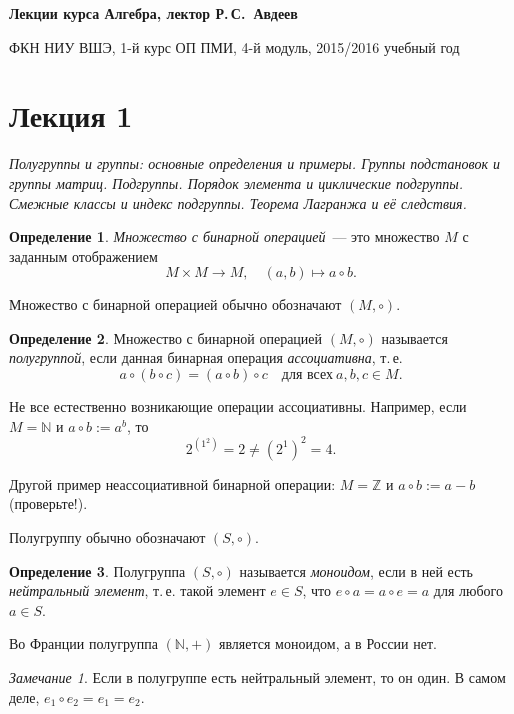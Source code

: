 \documentclass[a4paper,10pt]{amsart}
\def\ZZ{{\mathbb Z}}%
\def\NN{{\mathbb N}}%
\theoremstyle{definition}
\newtheorem{definition}{Определение}
\theoremstyle{remark}
\newtheorem{remark}{Замечание}
\begin{document}
%
\sloppy
%
\centerline{\large \bf Лекции курса \guillemotleft
Алгебра\guillemotright{}, лектор Р.\,С.~Авдеев}

\smallskip

\centerline{\large ФКН НИУ ВШЭ, 1-й курс ОП ПМИ, 4-й модуль,
2015/2016 учебный год}


\bigskip

\section*{Лекция 1}

\medskip

{\it Полугруппы и группы: основные определения и примеры. Группы
подстановок и группы матриц. Подгруппы. Порядок элемента и
циклические подгруппы. Смежные классы и индекс подгруппы. Теорема
Лагранжа и её следствия.}

\medskip

\begin{definition}
{\it Множество с бинарной операцией}~--- это множество $M$ с
заданным отображением
$$
M\times M \to M, \quad (a,b) \mapsto a\circ b.
$$
\end{definition}

Множество с бинарной операцией обычно обозначают $(M,\circ)$.

\begin{definition}
Множество с бинарной операцией $(M,\circ)$ называется {\it
полугруппой}, если данная бинарная операция {\it ассоциативна},
т.\,е.
$$
a\circ (b \circ c) = (a\circ b)\circ c \quad \text{для всех} \ a,b,c\in M.
$$
\end{definition}

Не все естественно возникающие операции ассоциативны. Например, если
$M=\NN$ и $a\circ b:=a^b$, то
$$
2^{\left(1^2\right)}=2\ne (2^1)^2=4.
$$

Другой пример неассоциативной бинарной операции: $M = \ZZ$ и $a
\circ b := a - b$ (проверьте!).

Полугруппу обычно обозначают $(S,\circ)$.

\begin{definition}
Полугруппа $(S,\circ)$ называется {\it моноидом}, если в ней есть
{\it нейтральный элемент}, т.\,е. такой элемент $e\in S$, что
$e\circ a=a\circ e=a$ для любого $a\in S$.
\end{definition}

Во Франции полугруппа $(\NN,+)$ является моноидом, а в России нет.

\begin{remark}
Если в полугруппе есть нейтральный элемент, то он один. В самом
деле, $e_1\circ e_2=e_1=e_2$.
\end{remark}
\end{document}
